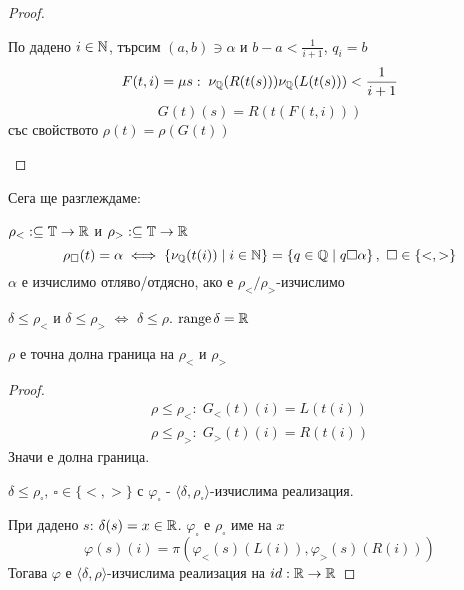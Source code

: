 \begin{proof}
\begin{itemize}
        По дадено $i\in{\mathbb{N}}$, търсим $(a, b) \ni \alpha$ и $b-a < \frac{1}{i+1}$, $q_i = b$
        \begin{equation}
            F(t, i) = \mu s:\; \nu_{\mathbb{Q}}(R(t(s))) \nu_{\mathbb{Q}}(L(t(s))) < \frac{1}{i+1}
        \end{equation}
        \begin{equation}
            G(t)(s) = R(t(F(t,i)))
        \end{equation}
        със свойството $\rho(t) = \rho(G(t))$
    \end{itemize}
\end{proof}

Сега ще разглеждаме:
\begin{definition}
    $\rho_<: \subseteq \mathbb T \to {\mathbb{R}}$ и $\rho_>: \subseteq \mathbb T \to {\mathbb{R}}$
    \begin{equation}
        \rho_\square(t) = \alpha \iff \left\{ \nu_{\mathbb{Q}}(t(i)) \mid i \in {\mathbb{N}} \right\} =  \left\{ q \in {\mathbb{Q}} \mid q \square \alpha \right\},\ \square \in \{<,>\}
    \end{equation}
    $\alpha$ е изчислимо отляво/отдясно, ако е $\rho_</\rho_>$-изчислимо
\end{definition}
\begin{proposition}
    $\delta \leq \rho_<$ и $\delta \leq \rho_>$ $\iff$ $\delta \leq \rho$. $\operatorname*{range} \delta = {\mathbb{R}}$

    $\rho$ е точна долна граница на $\rho_<$ и $\rho_>$
\end{proposition}
\begin{proof}
    \begin{equation}
        \begin{split}
            \rho \leq \rho_<:\; G_<(t)(i) = L(t(i))\\
            \rho \leq \rho_>:\; G_>(t)(i) = R(t(i))
        \end{split}
    \end{equation}
    Значи е долна граница.

    $\delta \leq \rho_\square,\ \square \in \{<,>\}$ с $\varphi_\square$ - $\langle \delta,\rho_\square\rangle$-изчислима реализация.

    При дадено $s$: $\delta(s) = x\in{\mathbb{R}}$. $\varphi_\square$ е $\rho_\square$ име на $x$
    \begin{equation}
        \varphi(s)(i) = \pi(\varphi_<(s)(L(i)), \varphi_>(s)(R(i)))
    \end{equation}
    Тогава $\varphi$ е $\langle\delta,\rho\rangle$-изчислима реализация на $id: {\mathbb{R}} \to {\mathbb{R}}$
\end{proof}
